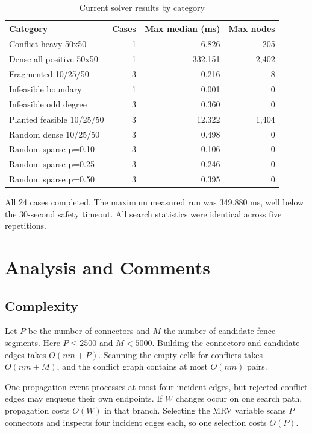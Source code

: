 \documentclass[11pt,a4paper]{article}
\begin{document}
\begin{table}[H]
\centering
\caption{Current solver results by category}
\begin{tabular}{lrrr}
\toprule
Category & Cases & Max median (ms) & Max nodes \\
\midrule
Conflict-heavy 50x50 & 1 & 6.826 & 205 \\
Dense all-positive 50x50 & 1 & 332.151 & 2,402 \\
Fragmented 10/25/50 & 3 & 0.216 & 8 \\
Infeasible boundary & 1 & 0.001 & 0 \\
Infeasible odd degree & 3 & 0.360 & 0 \\
Planted feasible 10/25/50 & 3 & 12.322 & 1,404 \\
Random dense 10/25/50 & 3 & 0.498 & 0 \\
Random sparse p=0.10 & 3 & 0.106 & 0 \\
Random sparse p=0.25 & 3 & 0.246 & 0 \\
Random sparse p=0.50 & 3 & 0.395 & 0 \\
\bottomrule
\end{tabular}
\end{table}

All 24 cases completed. The maximum measured run was 349.880 ms, well below
the 30-second safety timeout. All search statistics were identical across five
repetitions.

\section{Analysis and Comments}

\subsection{Complexity}

Let $P$ be the number of connectors and $M$ the number of candidate fence
segments. Here $P\le 2500$ and $M<5000$. Building the connectors and candidate
edges takes $O(nm+P)$. Scanning the empty cells for conflicts takes
$O(nm+M)$, and the conflict graph contains at most $O(nm)$ pairs.

One propagation event processes at most four incident edges, but rejected
conflict edges may enqueue their own endpoints. If $W$ changes occur on one
search path, propagation costs $O(W)$ in that branch. Selecting the MRV variable
scans $P$ connectors and inspects four incident edges each, so one selection
costs $O(P)$.
\end{document}
